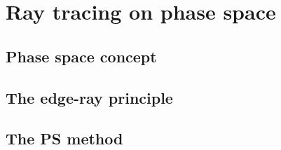 \chapter{Ray tracing on phase space}
\section{Phase space concept}
\section{The edge-ray principle}
\section{The PS method}

